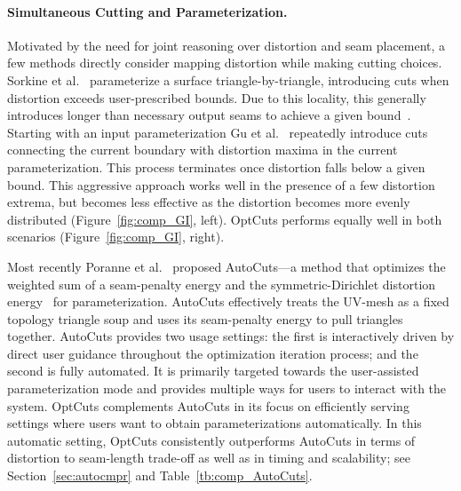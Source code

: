 \paragraph{Simultaneous Cutting and Parameterization.}
Motivated by the need for joint reasoning over distortion and seam placement, a few methods directly consider mapping distortion while making cutting choices. 
Sorkine et al.~ parameterize a surface triangle-by-triangle, introducing cuts when distortion exceeds user-prescribed bounds. Due to this locality, this generally introduces longer than necessary output seams to achieve a given bound~\cite{Hormann2008,Poranne2017Autocuts}. 
Starting with an input parameterization Gu et al.~  repeatedly introduce cuts connecting the current boundary with distortion maxima in the current parameterization. This process terminates once distortion falls below a given bound. This aggressive approach works well in the presence of a few distortion extrema, but becomes less effective as the distortion becomes more evenly distributed (Figure~\ref{fig:comp_GI}, left). OptCuts performs equally well in both scenarios (Figure~\ref{fig:comp_GI}, right).  

Most recently Poranne et al.\  proposed AutoCuts---a method that optimizes the weighted sum of a seam-penalty energy and the symmetric-Dirichlet distortion energy~\cite{Smith2015Bijective} for parameterization. AutoCuts effectively treats the UV-mesh as a fixed topology triangle soup and uses its seam-penalty energy to pull triangles together. AutoCuts provides two usage settings: the first is interactively driven by direct user guidance throughout the optimization iteration process; and the second is fully automated. It is primarily targeted towards the user-assisted parameterization mode and provides multiple ways for users to interact with the system. OptCuts complements AutoCuts in its focus on efficiently serving settings where users want to obtain parameterizations automatically. In this automatic setting, OptCuts consistently outperforms AutoCuts in terms of distortion to seam-length trade-off as well as in timing and scalability; see Section~\ref{sec:autocmpr} and Table~\ref{tb:comp_AutoCuts}. 

